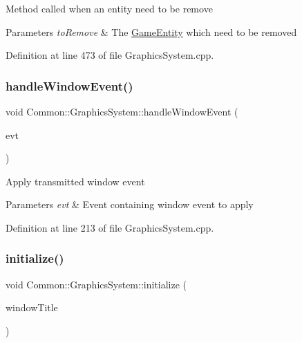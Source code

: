 Method called when an entity need to be remove 
\begin{DoxyParams}{Parameters}
{\em to\+Remove} & The \hyperlink{struct_common_1_1_game_entity}{Game\+Entity} which need to be removed \\
\hline
\end{DoxyParams}


Definition at line 473 of file Graphics\+System.\+cpp.

\mbox{\label{class_common_1_1_graphics_system_a16f86321da0331beaa393b9e1bbd48bd}} 
\subsubsection{\texorpdfstring{handle\+Window\+Event()}{handleWindowEvent()}}
{\footnotesize\ttfamily void Common\+::\+Graphics\+System\+::handle\+Window\+Event (\begin{DoxyParamCaption}\item[{const \hyperlink{union_s_d_l___event}{S\+D\+L\+\_\+\+Event} \&}]{evt }\end{DoxyParamCaption})\hspace{0.3cm}{\ttfamily [protected]}}

Apply transmitted window event 
\begin{DoxyParams}{Parameters}
{\em evt} & Event containing window event to apply \\
\hline
\end{DoxyParams}


Definition at line 213 of file Graphics\+System.\+cpp.

\mbox{\label{class_common_1_1_graphics_system_ad6aec10b001fbfc10cd86cd009615745}} 
\subsubsection{\texorpdfstring{initialize()}{initialize()}}
{\footnotesize\ttfamily void Common\+::\+Graphics\+System\+::initialize (\begin{DoxyParamCaption}\item[{const Ogre\+::\+String \&}]{window\+Title }\end{DoxyParamCaption})}

